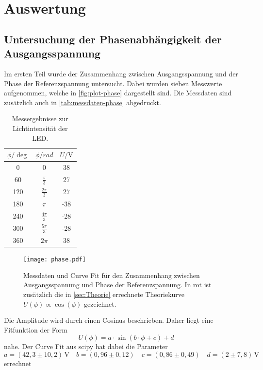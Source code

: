 \section{Auswertung}
\label{sec:Auswertung}

\subsection{Untersuchung der Phasenabhängigkeit der Ausgangsspannung}
\label{sec:Untersuchung der Phasenabhängigkeit der Ausgangsspannung}
Im ersten Teil wurde der Zusammenhang zwischen Ausgangsspannung und der Phase der
Referenzspannung untersucht. Dabei wurden sieben Messwerte aufgenommen, welche in
\autoref{fig:plot-phase} dargestellt sind. Die Messdaten sind zusätzlich auch in 
\autoref{tab:messdaten-phase} abgedruckt.
\begin{table}[H]
	\centering
	\caption{Messergebnisse zur Lichtintensität der LED.}
	\label{tab:messdaten-phase}
	\begin{tabular}{c c c}
		\toprule
		$\phi / \si{\deg}$ & $\phi / \si{rad}$ & $U / \si{\volt}$ \\
		\midrule
		0	& $0$			&38  \\
		60	& $\frac\pi3$		&27 \\
		120	& $\frac{2\pi}3$	&27 \\
		180	& $\pi$			&-38 \\
		240	& $\frac{4\pi}3$	&-28 \\
		300	& $\frac{5\pi}3$	&-28 \\
		360	& $2\pi$		&38 \\
		\bottomrule
	\end{tabular}
\end{table}
\begin{figure}
	\centering
	\texttt{[image: phase.pdf]}
	\caption{Messdaten und Curve Fit für den Zusammenhang zwischen Ausgangsspannung und
	Phase der Referenzspannung. In rot ist zusätzlich die in \autoref{sec:Theorie}
	errechnete Theoriekurve $U(\phi) \propto \cos(\phi)$ gezeichnet.}
	\label{fig:plot-phase}
\end{figure}
Die Amplitude wird durch einen Cosinus beschrieben. Daher liegt eine Fitfunktion der Form
\begin{equation}
	U(\phi) = a \cdot \sin\left(b \cdot \phi + c\right) + d
\end{equation}
nahe.
Der Curve Fit aus scipy hat dabei die Parameter
\begin{equation}
	a = (42,3 \pm 10,2) \, \si{\volt}
	\quad
	b = (0,96 \pm 0,12)
	\quad
	c = (0,86 \pm 0,49)
	\quad
	d = (2 \pm 7,8) \, \si{\volt}
	\label{eqn:parameter-phase}
\end{equation}
errechnet


